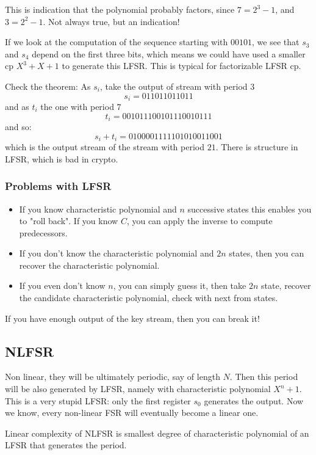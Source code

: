 \documentclass[language=english,number=]{homework}
\begin{document}
This is indication that the polynomial probably factors, since $7 = 2^3 - 1$, and $3 = 2^2 - 1$.
Not always true, but an indication!

If we look at the computation of the sequence starting with $00101$, we see that $s_3$ and $s_4$ depend on the first three bits, which means we could have used a smaller cp $X^3 + X + 1$ to generate this LFSR.
This is typical for factorizable LFSR cp.

Check the theorem:
As $s_i$, take the output of stream with period $3$
\[
s_i = 011 011 011 011
\]
and as $t_i$ the one with period $7$
\[
t_i = 001011100101110010111
\]
and so:
\[
s_i + t_i = 0100001111101010011001
\]
which is the output stream of the stream with period $21$.
There is structure in LFSR, which is bad in crypto.


\subsubsection{Problems with LFSR}

\begin{itemize}
\item If you know characteristic polynomial and $n$ successive states this enables you to "roll back".
If you know $C$, you can apply the inverse to compute predecessors.
\item If you don't know the characteristic polynomial and $2n$ states, then you can recover the characteristic polynomial. %
\item If you even don't know $n$, you can simply guess it, then take $2n$ state, recover the candidate characteristic polynomial, check with next from states.
\end{itemize}
If you have enough output of the key stream, then you can break it!

\newpage
\subsection{NLFSR}

Non linear, they will be ultimately periodic, say of length $N$.
Then this period will be also generated by LFSR, namely with characteristic polynomial $X^n + 1$.
This is a very stupid LFSR: only the first register $s_0$ generates the output.
Now we know, every non-linear FSR will eventually become a linear one.

\begin{definition}
Linear complexity of NLFSR is smallest degree of characteristic polynomial of an LFSR that generates the period.
\end{definition}
\end{document}
